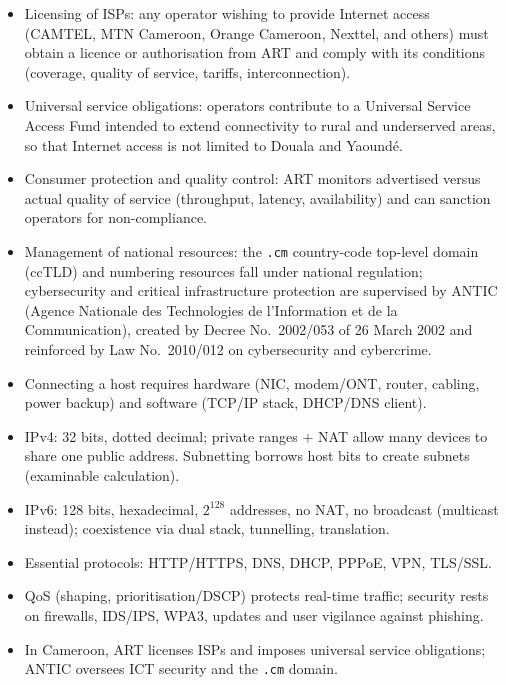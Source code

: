 \documentclass[11pt]{article}
\newcommand{\cle}[1]{{\popxbold\color{popdark}#1}}
\begin{document}
\begin{itemize}
\item \cle{Licensing of ISPs}: any operator wishing to provide Internet access (CAMTEL, MTN Cameroon, Orange Cameroon, Nexttel, and others) must obtain a licence or authorisation from ART and comply with its conditions (coverage, quality of service, tariffs, interconnection).
\item \cle{Universal service obligations}: operators contribute to a Universal Service Access Fund intended to extend connectivity to rural and underserved areas, so that Internet access is not limited to Douala and Yaoundé.
\item \cle{Consumer protection and quality control}: ART monitors advertised versus actual quality of service (throughput, latency, availability) and can sanction operators for non-compliance.
\item \cle{Management of national resources}: the \texttt{.cm} country-code top-level domain (ccTLD) and numbering resources fall under national regulation; cybersecurity and critical infrastructure protection are supervised by \cle{ANTIC} (Agence Nationale des Technologies de l'Information et de la Communication), created by Decree No.~2002/053 of 26 March 2002 and reinforced by Law No.~2010/012 on cybersecurity and cybercrime.
\end{itemize}

\begin{aretenir}
\begin{itemize}
\item Connecting a host requires hardware (NIC, modem/ONT, router, cabling, power backup) and software (TCP/IP stack, DHCP/DNS client).
\item IPv4: 32 bits, dotted decimal; private ranges + NAT allow many devices to share one public address. Subnetting borrows host bits to create subnets (examinable calculation).
\item IPv6: 128 bits, hexadecimal, $2^{128}$ addresses, no NAT, no broadcast (multicast instead); coexistence via dual stack, tunnelling, translation.
\item Essential protocols: HTTP/HTTPS, DNS, DHCP, PPPoE, VPN, TLS/SSL.
\item QoS (shaping, prioritisation/DSCP) protects real-time traffic; security rests on firewalls, IDS/IPS, WPA3, updates and user vigilance against phishing.
\item In Cameroon, ART licenses ISPs and imposes universal service obligations; ANTIC oversees ICT security and the \texttt{.cm} domain.
\end{itemize}
\end{aretenir}
\end{document}

